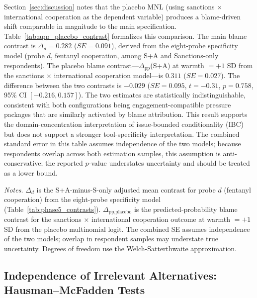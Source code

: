 \documentclass[12pt,letterpaper]{article}
\begin{document}
Section~\ref{sec:discussion} notes that the placebo MNL (using sanctions $\times$ international cooperation as the dependent variable) produces a blame-driven shift comparable in magnitude to the main specification. Table~\ref{tab:app_placebo_contrast} formalizes this comparison. The main blame contrast is $\Delta_d = 0.282$ ($SE = 0.091$), derived from the eight-probe specificity model (probe $d$, fentanyl cooperation, among S+A and Sanctions-only respondents). The placebo blame contrast---$\Delta_{\text{pp}}$(S+A) at warmth $= +1$ SD from the sanctions $\times$ international cooperation model---is $0.311$ ($SE = 0.027$). The difference between the two contrasts is $-0.029$ ($SE = 0.095$, $t = -0.31$, $p = 0.758$, 95\% CI $[-0.216, 0.157]$). The two estimates are statistically indistinguishable, consistent with both configurations being engagement-compatible pressure packages that are similarly activated by blame attribution. This result supports the domain-concentration interpretation of issue-bounded conditionality (IBC) but does not support a stronger tool-specificity interpretation. The combined standard error in this table assumes independence of the two models; because respondents overlap across both estimation samples, this assumption is anti-conservative; the reported $p$-value understates uncertainty and should be treated as a lower bound.

\begin{table}[htbp]
\centering
\small
\caption{Formal Placebo Contrast: Main vs.\ Placebo Blame Effects on S+A Probability}
\label{tab:app_placebo_contrast}

\par\vspace{0.5ex}
{\footnotesize\textit{Notes.} $\Delta_d$ is the S+A-minus-S-only adjusted mean contrast for probe $d$ (fentanyl cooperation) from the eight-probe specificity model (Table~\ref{tab:phase5_contrasts}). $\Delta_{\text{pp,placebo}}$ is the predicted-probability blame contrast for the sanctions $\times$ international cooperation outcome at warmth $= +1$ SD from the placebo multinomial logit. The combined SE assumes independence of the two models; overlap in respondent samples may understate true uncertainty. Degrees of freedom use the Welch-Satterthwaite approximation.}
\end{table}

\subsection{Independence of Irrelevant Alternatives: Hausman--McFadden Tests}
\label{sec:app_iia}
\end{document}
